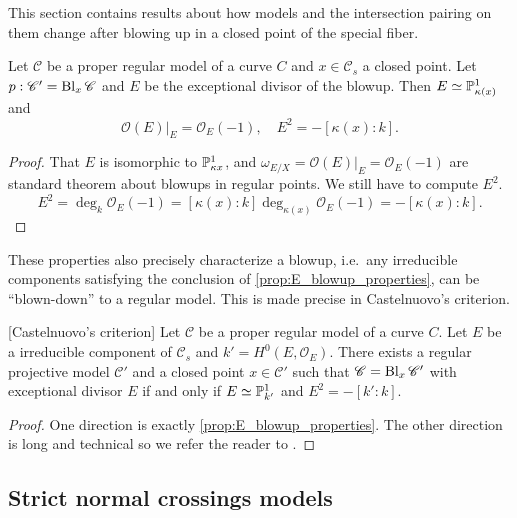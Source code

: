 This section contains results about how models and the intersection pairing on them change after blowing up in a closed point of the special fiber.  

\begin{proposition}\label{prop:E_blowup_properties}
	Let $\mathscr C$ be a proper regular model of a curve $C$ and $x \in \mathscr C_s$ a closed point. 
	Let $p: \mathscr C' = \operatorname{Bl}_x \mathscr C$ and $E$ be the exceptional divisor of the blowup. 
	Then $E \simeq \mathbb{P}^{1}_{\kappa(x)}$ and \[
		\mathcal{O}(E)|_E = \mathcal{O}_E(-1), \quad E^2 = -[\kappa (x): k]
	.\] 
\end{proposition}
\begin{proof}
	That $E$ is isomorphic to $\mathbb{P}^{1}_{\kappa x}$, and $\omega_{E / X} = \mathcal{O}(E)|_E = \mathcal{O}_E(-1)$ are standard theorem about blowups in regular points. 
	We still have to compute $E^2$. 
	\[
		E^2 = \deg_k \mathcal{O}_E(-1) = [\kappa(x): k] \deg_{\kappa (x)} \mathcal{O}_E(-1) = -[\kappa(x): k]
	.\] 
\end{proof}

These properties also precisely characterize a blowup, i.e.\ any irreducible components satisfying the conclusion of \cref{prop:E_blowup_properties}, can be ``blown-down'' to a regular model.
This is made precise in Castelnuovo's criterion. 

\begin{theorem}\label{thm:castelnuovo}
	[Castelnuovo's criterion]
	Let $\mathscr C$ be a proper regular model of a curve $C$.
	Let $E$ be a irreducible component of $\mathscr C_s$ and $k' = H^{0}(E, \mathcal{O}_E)$. 
	There exists a regular projective model $\mathscr C'$ and a closed point $x \in \mathscr C'$ such that $\mathscr C = \operatorname{Bl}_x \mathscr C'$ with exceptional divisor $E$ if and only if $E \simeq \mathbb{P}_{k'}^{1}$ and $E^2 = -[k': k]$. 
\end{theorem}
\begin{proof}
	One direction is exactly \cref{prop:E_blowup_properties}. 
	The other direction is long and technical so we refer the reader to \cite[sec.\ 9.3.1]{liuAlgebraicGeometryArithmetic2002}.
\end{proof}

\subsection{Strict normal crossings models} \label{sec:strict_normal_crossings_models}

